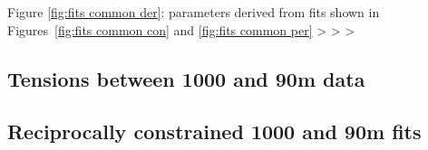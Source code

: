 \> Figure \ref{fig:fits common der}: parameters derived from fits shown in Figures~\ref{fig:fits common con} and \ref{fig:fits common per}
\>> 
\>> 
\>> 

\subsection{Tensions between 1000 and 90m data}


\subsection{Reciprocally constrained 1000 and 90m fits}
